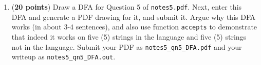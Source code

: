 \documentclass{article}
\begin{document}
\begin{enumerate}
\item ({\bf 20 points}) Draw a DFA for Question 5 of {\tt notes5.pdf}.
  Next, enter this DFA and generate a PDF drawing for it, and submit it. Argue why
  this DFA works (in about 3-4 sentences), and also use function
  \verb|accepts| to demonstrate that indeed it works on five (5) 
  strings in the language and five (5) strings not in the language.
  Submit your PDF as \verb|notes5_qn5_DFA.pdf|
  and your writeup as \verb|notes5_qn5_DFA.out|.

\end{enumerate}
\end{document}
